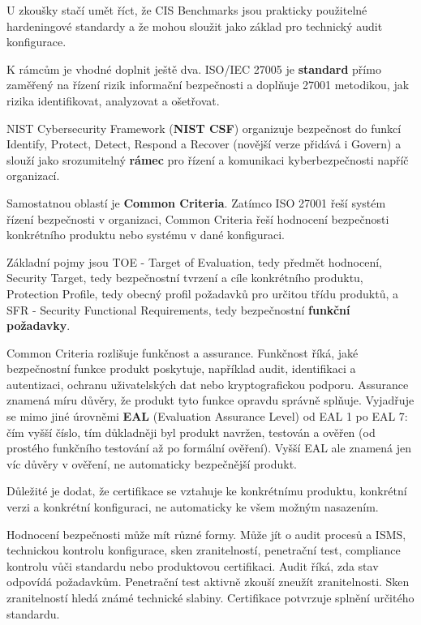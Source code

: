 \documentclass[11pt,a4paper]{article}
\begin{document}
U zkoušky stačí umět říct, že CIS Benchmarks jsou prakticky použitelné hardeningové standardy a že mohou sloužit jako základ pro technický audit konfigurace.

K rámcům je vhodné doplnit ještě dva. ISO/IEC 27005 je \textbf{standard} přímo zaměřený na řízení rizik informační bezpečnosti a doplňuje 27001 metodikou, jak rizika identifikovat, analyzovat a ošetřovat.

NIST Cybersecurity Framework (\textbf{NIST CSF}) organizuje bezpečnost do funkcí Identify, Protect, Detect, Respond a Recover (novější verze přidává i Govern) a slouží jako srozumitelný \textbf{rámec} pro řízení a komunikaci kyberbezpečnosti napříč organizací.

Samostatnou oblastí je \textbf{Common Criteria}. Zatímco ISO 27001 řeší systém řízení bezpečnosti v organizaci, Common Criteria řeší hodnocení bezpečnosti konkrétního produktu nebo systému v dané konfiguraci.

Základní pojmy jsou TOE - Target of Evaluation, tedy předmět hodnocení, Security Target, tedy bezpečnostní tvrzení a cíle konkrétního produktu, Protection Profile, tedy obecný profil požadavků pro určitou třídu produktů, a SFR - Security Functional Requirements, tedy bezpečnostní \textbf{funkční požadavky}.

Common Criteria rozlišuje funkčnost a assurance. Funkčnost říká, jaké bezpečnostní funkce produkt poskytuje, například audit, identifikaci a autentizaci, ochranu uživatelských dat nebo kryptografickou podporu. Assurance znamená míru důvěry, že produkt tyto funkce opravdu správně splňuje. Vyjadřuje se mimo jiné úrovněmi \textbf{EAL} (Evaluation Assurance Level) od EAL 1 po EAL 7: čím vyšší číslo, tím důkladněji byl produkt navržen, testován a ověřen (od prostého funkčního testování až po formální ověření). Vyšší EAL ale znamená jen víc důvěry v ověření, ne automaticky bezpečnější produkt.

Důležité je dodat, že certifikace se vztahuje ke konkrétnímu produktu, konkrétní verzi a konkrétní konfiguraci, ne automaticky ke všem možným nasazením.

Hodnocení bezpečnosti může mít různé formy. Může jít o audit procesů a ISMS, technickou kontrolu konfigurace, sken zranitelností, penetrační test, compliance kontrolu vůči standardu nebo produktovou certifikaci. Audit říká, zda stav odpovídá požadavkům. Penetrační test aktivně zkouší zneužít zranitelnosti. Sken zranitelností hledá známé technické slabiny. Certifikace potvrzuje splnění určitého standardu.
\end{document}
